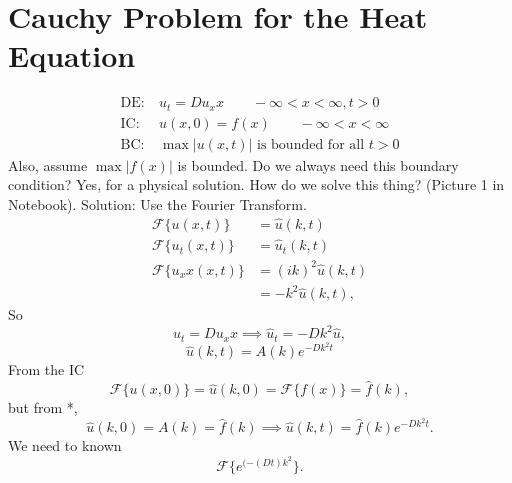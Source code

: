 \documentclass[cm]{article}
\newcommand{\fhat}{\hat{f}}
\renewcommand{\F}{\mathscr F}
\newcommand{\uhat}{\hat{u}}
\begin{document}
\section{Cauchy Problem for the Heat Equation}
\begin{align*}
\text{DE:}&~u_t = Du_xx \qquad - \infty < x < \infty, t > 0 \\
\text{IC:}&~ u(x,0) = f(x)\qquad - \infty < x < \infty \\
\text{BC:}&~ \max |u(x,t)| \text{ is bounded for all } t > 0
\end{align*}
Also, assume $\max|f(x)|$ is bounded. Do we always need this boundary condition? Yes, for a physical solution. How do we solve this thing? (Picture 1 in Notebook). Solution: Use the Fourier Transform.
\begin{align*}
\F \{ u(x,t) \} &= \uhat(k,t) \\
\F \{ u_t(x,t) \} &= \uhat_t(k,t) \\
\F \{ u_xx(x,t) \} &= (ik)^2 \uhat(k,t) \\
&= -k^2 \uhat(k,t),
\end{align*}
So
$$u_t = Du_xx \implies \uhat_t = -Dk^2 \uhat,$$
\begin{equation*}
\uhat(k,t) = A(k) e^{-Dk^2 t} \tag{*}
\end{equation*}
From the IC
$$\F \{u(x,0) \} = \uhat(k,0) = \F \{ f(x) \} = \fhat(k),$$
but from *,
$$\uhat(k,0) = A(k) = \fhat(k) \implies \uhat(k,t) = \fhat(k) e^{-Dk^2 t}.$$
We need to known
$$\F \{e^{(-(Dt)k^2}\}.$$
\end{document}
